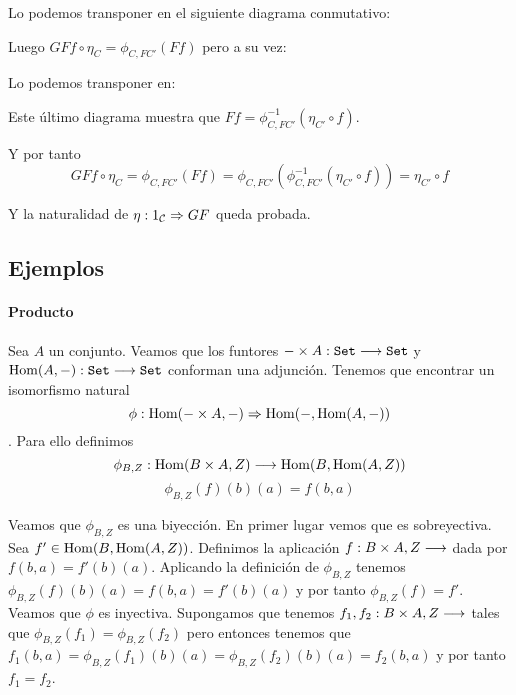Lo podemos transponer en el siguiente diagrama conmutativo:

\begin{center}
\end{center}

Luego $GFf \circ \eta_C = \phi_{C, FC'}(Ff)$ pero a su vez:


\begin{center}
\end{center}

Lo podemos transponer en:

\begin{center}
\end{center}

Este último diagrama muestra que
$Ff = \phi^{-1}_{C, FC'}(\eta_{C'} \circ f)$.


Y por tanto
$$GFf \circ \eta_C = \phi_{C, FC'}(Ff) = \phi_{C, FC'}
  (\phi^{-1}_{C,FC'}(\eta_{C'} \circ f)) = \eta_{C'} \circ f$$

Y la naturalidad de $\eta : 1_{\mathcal{C}}\Rightarrow GF$ queda probada.

\subsection{Ejemplos}
\paragraph{Producto}
Sea $A$ un conjunto. Veamos que los funtores
$-\times A : \texttt{Set}\longrightarrow \texttt{Set}$ y
$\operatorname{Hom}(A, -) : \texttt{Set}\longrightarrow \texttt{Set}$ conforman una adjunción.
Tenemos que encontrar un isomorfismo natural
$$\phi : \operatorname{Hom}(-\times A, -)\Rightarrow \operatorname{Hom}(-, \operatorname{Hom}(A, -))$$.
Para ello definimos
$$\phi_{B, Z} : \operatorname{Hom}(B\times A, Z)\longrightarrow \operatorname{Hom}(B, \operatorname{Hom}(A, Z))$$
$$\phi_{B, Z}(f)(b)(a) = f(b, a)$$

Veamos que $\phi_{B, Z}$ es una biyección.
En primer lugar vemos que es sobreyectiva.
Sea $f' \in \operatorname{Hom}(B, \operatorname{Hom}(A, Z))$. Definimos la aplicación
$f : \arr{B\times A, Z}$ dada por $f(b, a) = f'(b)(a)$. Aplicando
la definición de $\phi_{B, Z}$
tenemos $\phi_{B,Z}(f)(b)(a) = f(b, a) = f'(b)(a)$ y por tanto
$\phi_{B,Z}(f) = f'$. Veamos que $\phi$ es inyectiva. Supongamos
que tenemos $f_1, f_2 : \arr{B\times A, Z}$ tales que
$\phi_{B, Z}(f_1) = \phi_{B, Z}(f_2)$ pero entonces tenemos que
$f_1(b, a) = \phi_{B, Z}(f_1)(b)(a) = \phi_{B,Z}(f_2)(b)(a) = f_2(b, a)$
y por tanto $f_1 = f_2$.

